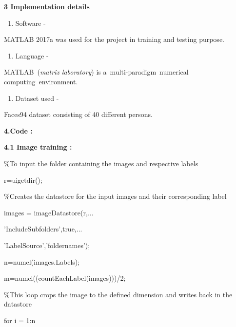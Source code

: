 \documentclass{article} %
\begin{document}
\noindent 

\noindent 

\noindent \textbf{3  Implementation details}

\begin{enumerate}
\item \textbf{ }Software   -    
\end{enumerate}

\noindent         MATLAB 2017a was used for the project in training and testing purpose.

\begin{enumerate}
\item  Language   -
\end{enumerate}

\noindent         MATLAB~(\textit{matrix laboratory}) is a~multi-paradigm~numerical computing~environment.

\begin{enumerate}
\item  Dataset used  -
\end{enumerate}

\noindent          Faces94 dataset consisting of 40 different persons.

\noindent \textbf{}

\noindent \textbf{}

\noindent \textbf{}

\noindent \textbf{4.Code :}

\noindent \textbf{4.1 Image training :}

\noindent \textbf{}

\noindent \%To input the folder containing the images and respective labels

\noindent r=uigetdir();

\noindent 

\noindent \%Creates the datastore for the input images and their corresponding label

\noindent images = imageDatastore(r,...

\noindent     'IncludeSubfolders',true,...

\noindent    'LabelSource','foldernames');

\noindent n=numel(images.Labels);

\noindent m=numel((countEachLabel(images)))/2;

\noindent 

\noindent \%This loop crops the image to the defined dimension and writes back in the datastore 

\noindent for i = 1:n
\end{document}
